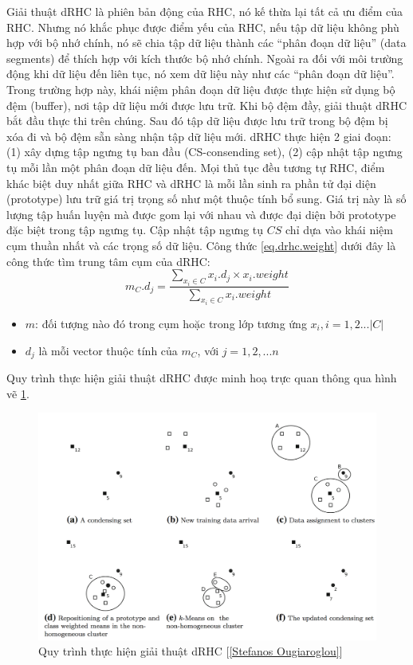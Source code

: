 \documentclass[13pt,oneside]{scrbook}
\begin{document}
Giải thuật dRHC là phiên bản động của RHC, nó kế thừa lại tất cả ưu điểm của RHC. 
Nhưng nó khắc phục được điểm yếu của RHC, nếu tập dữ liệu không phù hợp với bộ nhớ chính, nó sẽ chia tập dữ liệu thành các “phân đoạn dữ liệu” (data segments) để thích hợp với kích thước bộ nhớ chính. 
Ngoài ra đối với môi trường động khi dữ liệu đến liên tục, nó xem dữ liệu này như các “phân đoạn dữ liệu”. 
Trong trường hợp này, khái niệm phân đoạn dữ liệu được thực hiện sử dụng bộ đệm (buffer), nơi tập dữ liệu mới được lưu trữ. 
Khi bộ đệm đầy, giải thuật dRHC bắt đầu thực thi trên chúng. 
Sau đó tập dữ liệu được lưu trữ trong bộ đệm bị xóa đi và bộ đệm sẵn sàng nhận tập dữ liệu mới. 
dRHC thực hiện 2 giai đoạn: 
(1) xây dựng tập ngưng tụ ban đầu (CS-consending set), 
(2) cập nhật tập ngưng tụ mỗi lần một phân đoạn dữ liệu đến. 
Mọi thủ tục đều tương tự RHC, điểm khác biệt duy nhất giữa RHC và dRHC là mỗi lần sinh ra phần tử đại diện (prototype) lưu trữ giá trị trọng số như một thuộc tính bổ sung. 
Giá trị này là số lượng tập huấn luyện mà được gom lại với nhau và được đại diện bởi prototype đặc biệt trong tập ngưng tụ. 
Cập nhật tập ngưng tụ $CS$ chỉ dựa vào khái niệm cụm thuần nhất và các trọng số dữ liệu.
Công thức \ref{eq.drhc.weight} dưới đây là công thức tìm trung tâm cụm của dRHC:
\begin{equation}\label{eq.drhc.weight}
{m_C}.{d_j} = \frac{{\sum\limits_{{x_i} \in C} {{x_i}.{d_j} \times {x_i}.weight} }}{{\sum\limits_{{x_i} \in C} {{x_i}.weight} }}
\end{equation}
\begin{itemize}
\item $m$: đối tượng nào đó trong cụm hoặc trong lớp tương ứng  $x_i, i= 1, 2. . .|C|$
\item $d_j$ là mỗi vector thuộc tính của $m_C$, với $j = 1, 2,... n$

\end{itemize}
Quy trình thực hiện giải thuật dRHC được minh hoạ trực quan thông qua hình vẽ \ref{dRHC.png}.
\begin{figure}[h!]
	\begin{center}
		\includegraphics[width=145mm]{dRHC.png}
		\caption{Quy trình thực hiện giải thuật dRHC [\ref{Stefanos Ougiaroglou}]}
		\label{dRHC.png}
	\end{center}
\end{figure}
\end{document}
